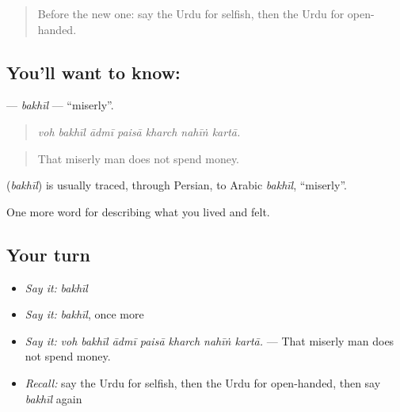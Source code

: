 \label{lesson:UR-C459-bakhil}



\begin{quote}
Before the new one: say the Urdu for selfish, then the Urdu for open-handed.
\end{quote}

\subsection*{You'll want to know: }
\textbf{} — \emph{bakhīl} — \textquotedblleft{}miserly\textquotedblright{}.

\begin{quote}
      
\end{quote}

\begin{quote}
\emph{voh bakhīl ādmī paisā kharch nahīṅ kartā.}
\end{quote}

\begin{quote}
That miserly man does not spend money.
\end{quote}

\begin{cousinweb}
\textbf{} (\emph{bakhīl}) is usually traced, through Persian, to Arabic \emph{bakhīl}, \textquotedblleft{}miserly\textquotedblright{}.
\end{cousinweb}

\begin{grammarlens}[title={What you've built}]
One more word for describing what you lived and felt.
\end{grammarlens}

\subsection*{Your turn}
\begin{itemize}
\raggedright
  \item \emph{Say it:} \emph{bakhīl}
  \item \emph{Say it:} \emph{bakhīl}, once more
  \item \emph{Say it:} \emph{voh bakhīl ādmī paisā kharch nahīṅ kartā.} — That miserly man does not spend money.
  \item \emph{Recall:} say the Urdu for selfish, then the Urdu for open-handed, then say \emph{bakhīl} again
\end{itemize}

